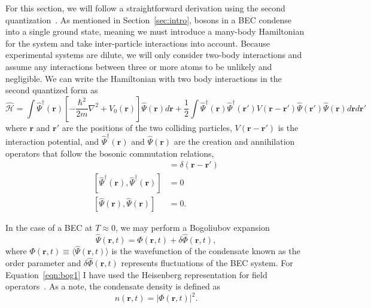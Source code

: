 For this section, we will follow a straightforward derivation using the second quantization~\cite{aversa2008}.
As mentioned in Section~\ref{sec:intro}, bosons in a BEC condense into a single ground state, meaning we must introduce a many-body Hamiltonian for the system and take inter-particle interactions into account.
Because experimental systems are dilute, we will only consider two-body interactions and assume any interactions between three or more atoms to be unlikely and negligible.
We can write the Hamiltonian with two body interactions in the second quantized form as
\begin{equation}
    \mathcal{\hat H} = \int \hat \Psi^\dagger(\mathbf{r})\left[-\frac{\hbar^2}{2m}\nabla^2 + V_0(\mathbf{r}) \right]\hat \Psi(\mathbf{r}) d\mathbf{r} + \frac{1}{2} \int  \hat \Psi^\dagger(\mathbf{r}) \hat \Psi^\dagger(\mathbf{r'}) V(\mathbf{r} - \mathbf{r'})\hat \Psi(\mathbf{r'}) \hat \Psi(\mathbf{r}) d\mathbf{r} d\mathbf{r'}
    \label{eqn:2nd}
\end{equation}
where $\mathbf{r}$ and $\mathbf{r'}$ are the positions of the two colliding particles, $V(\mathbf{r}-\mathbf{r'})$ is the interaction potential, and $\hat \Psi^\dagger(\mathbf{r})$ and $\hat \Psi(\mathbf{r})$ are the creation and annihilation operators that follow the bosonic commutation relations,
\begin{align}
 [\hat \Psi(\mathbf{r}),\hat \Psi^\dagger(\mathbf{r})] &= \delta(\mathbf{r} - \mathbf{r'}) \\
 [\hat \Psi^\dagger(\mathbf{r}),\hat \Psi^\dagger(\mathbf{r})] &= 0 \\
 [\hat \Psi(\mathbf{r}),\hat \Psi(\mathbf{r})] &= 0.
\end{align}

\noindent In the case of a BEC at $T\approx0$, we may perform a Bogoliubov expansion~\cite{bogoliubov1947, dalfovo1999}
\begin{equation}
    \hat \Psi (\mathbf{r}, t) = \Phi(\mathbf{r},t) + \delta \hat \Phi(\mathbf{r},t),
\label{eqn:bog1}
\end{equation}
where $\Phi(\mathbf{r},t) \equiv \langle \hat \Psi(\mathbf{r},t) \rangle$ is the wavefunction of the condensate known as the order parameter and $\delta \hat \Phi(\mathbf{r},t)$ represents fluctuations of the BEC system.
For Equation~\eqref{eqn:bog1} I have used the Heisenberg representation for field operators~\cite{dalfovo1999}.
As a note, the condensate density is defined as
\begin{equation}
    n(\mathbf{r},t) = |\Phi(\mathbf{r},t)|^2.
\end{equation}

